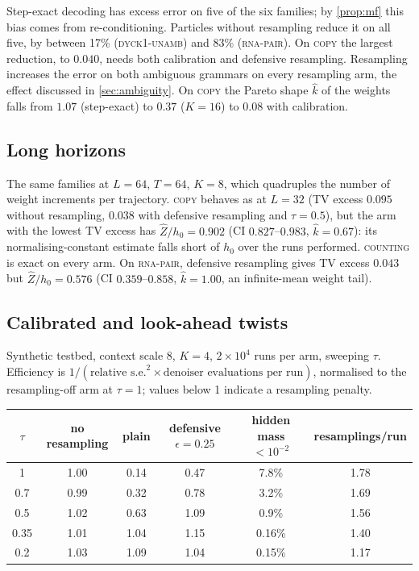 \documentclass[11pt]{article}
\theoremstyle{definition}
\newcommand{\Zh}{\widehat Z}
\begin{document}
Step-exact decoding has excess error on five of the six families; by \cref{prop:mf} this bias comes from
re-conditioning. Particles without resampling reduce it on all five, by between 17\% (\textsc{dyck1-unamb}) and
83\% (\textsc{rna-pair}). On \textsc{copy} the largest reduction, to $0.040$, needs both calibration and
defensive resampling. Resampling increases the error on both ambiguous grammars on every resampling arm, the
effect discussed in \cref{sec:ambiguity}. On \textsc{copy} the Pareto shape $\hat k$ of the weights falls from
$1.07$ (step-exact) to $0.37$ ($K=16$) to $0.08$ with calibration.

\subsection{Long horizons}\label{sec:expb}
The same families at $L=64$, $T=64$, $K=8$, which quadruples the number of weight increments per trajectory.
\textsc{copy} behaves as at $L=32$ (TV excess $0.095$ without resampling, $0.038$ with defensive resampling and
$\tau=0.5$), but the arm with the lowest TV excess has $\Zh/h_0=0.902$ (CI $0.827$--$0.983$, $\hat k=0.67$): its
normalising-constant estimate falls short of $h_0$ over the runs performed. \textsc{counting} is exact on every
arm. On \textsc{rna-pair}, defensive resampling gives TV excess $0.043$ but $\Zh/h_0=0.576$ (CI
$0.359$--$0.858$, $\hat k=1.00$, an infinite-mean weight tail).

\subsection{Calibrated and look-ahead twists}\label{sec:expcal}
Synthetic testbed, context scale 8, $K=4$, $2\times10^4$ runs per arm, sweeping $\tau$. Efficiency is
$1/(\text{relative s.e.}^2\times\text{denoiser evaluations per run})$, normalised to the resampling-off arm at
$\tau=1$; values below 1 indicate a resampling penalty.

\begin{center}\small
\begin{tabular}{cccccc}
\toprule
$\tau$ & no resampling & plain & defensive $\epsilon=0.25$ & hidden mass $<10^{-2}$ & resamplings/run \\
\midrule
1    & 1.00 & 0.14 & 0.47 & 7.8\%  & 1.78\\
0.7  & 0.99 & 0.32 & 0.78 & 3.2\%  & 1.69\\
0.5  & 1.02 & 0.63 & 1.09 & 0.9\%  & 1.56\\
0.35 & 1.01 & 1.04 & 1.15 & 0.16\% & 1.40\\
0.2  & 1.03 & 1.09 & 1.04 & 0.15\% & 1.17\\
\bottomrule
\end{tabular}
\end{center}
\end{document}
